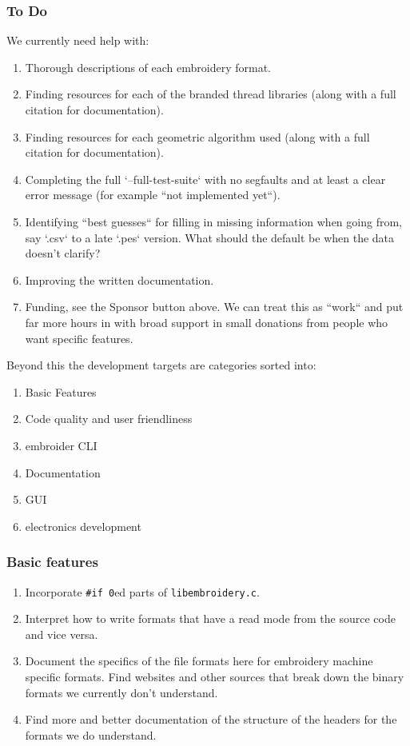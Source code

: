 \documentclass[a4paper, 11pt]{report}
\begin{document}
\subsubsection{To Do}

We currently need help with:

\begin{enumerate}
\item Thorough descriptions of each embroidery format.
\item Finding resources for each of the branded thread libraries (along with a full citation for documentation).
\item Finding resources for each geometric algorithm used (along with a full citation for documentation).
\item Completing the full `--full-test-suite`  with no segfaults and at least a clear error message (for example ``not implemented yet``).
\item Identifying ``best guesses`` for filling in missing information when going from, say `.csv` to a late `.pes` version. What should the default be when the data doesn't clarify?
\item Improving the written documentation.
\item Funding, see the Sponsor button above. We can treat this as ``work`` and put far more hours in with broad support in small donations from people who want specific features.
\end{enumerate}

Beyond this the development targets are categories sorted into:

\begin{enumerate}
\item Basic Features
\item Code quality and user friendliness
\item embroider CLI
\item Documentation
\item GUI
\item electronics development
\end{enumerate}

\subsubsection{Basic features}

\begin{enumerate}
\item Incorporate \texttt{\#if 0}ed parts of \texttt{libembroidery.c}.
\item Interpret how to write formats that have a read mode from the source code and vice versa.
\item Document the specifics of the file formats here for embroidery machine specific formats. Find websites and other sources that break down the binary formats we currently don't understand.
\item Find more and better documentation of the structure of the headers for the formats we do understand.
\end{enumerate}
\end{document}
